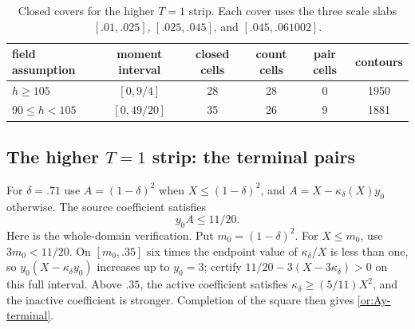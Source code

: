 \begin{table}[ht]
\centering
\caption{Closed covers for the higher $T=1$ strip.  Each cover uses
the three scale slabs $[.01,.025]$, $[.025,.045]$, and
$[.045,.061002]$.}\label{or:T-cover}
\begin{tabular}{@{}lccccc@{}}
\toprule
field assumption&moment interval&closed cells&count cells&pair cells&contours\\
\midrule
$h\ge105$&$[0,9/4]$&28&28&0&1950\\
$90\le h<105$&$[0,49/20]$&35&26&9&1881\\
\bottomrule
\end{tabular}
\end{table}

\subsection{The higher $T=1$ strip: the terminal pairs}

For $\delta=.71$ use $A=(1-\delta)^2$ when
$X\le(1-\delta)^2$, and $A=X-\kappa_\delta(X)y_0$ otherwise.
The source coefficient satisfies
\begin{equation}\label{or:Ay-terminal}
                             y_0 A\le11/20.
\end{equation}
Here is the whole-domain verification.  Put $m_0=(1-\delta)^2$.
For $X\le m_0$, use $3m_0<11/20$.  On $[m_0,.35]$ six times
the endpoint value of $\kappa_\delta/X$ is less than one, so
$y_0(X-\kappa_\delta y_0)$ increases up to $y_0=3$; certify
$11/20-3(X-3\kappa_\delta)>0$ on this full interval.
Above $.35$, the active coefficient satisfies
$\kappa_\delta\ge(5/11)X^2$, and the inactive coefficient is stronger.
Completion of the square then gives \eqref{or:Ay-terminal}.

